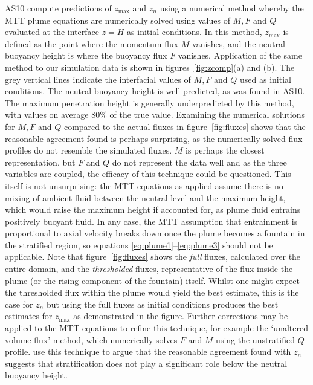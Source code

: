 \documentclass[a4paper]{article}
\begin{document}
AS10 compute predictions of $z_{\max}$ and $z_n$ using a numerical method whereby the MTT plume equations are
numerically solved using values of $M, F$ and $Q$ evaluated at the interface $z=H$ as initial conditions. In
this method, $z_{\max}$ is defined as the point where the momentum flux $M$ vanishes, and the neutral buoyancy
height is where the buoyancy flux $F$ vanishes. Application of the same method to our simulation data is shown
in figures~\ref{fig:zcomp}(a) and (b). The grey vertical lines indicate the interfacial values of $M, F$ and
$Q$ used as initial conditions. The neutral buoyancy height is well predicted, as was found in AS10. The
maximum penetration height is generally underpredicted by this method, with values on average $80\%$ of the
true value. Examining the numerical solutions for $M, F$ and $Q$ compared to the actual fluxes in
figure~\ref{fig:fluxes} shows that the reasonable agreement found is perhaps surprising, as the numerically
solved flux profiles do not resemble the simulated fluxes. $M$ is perhaps the closest representation, but $F$
and $Q$ do not represent the data well and as the three variables are coupled, the efficacy of this technique
could be questioned. This itself is not unsurprising: the MTT equations as applied assume there is no mixing
of ambient fluid between the neutral level and the maximum height, which would raise the maximum height if
accounted for, as plume fluid entrains positively buoyant fluid. In any case, the MTT assumption that
entrainment is proportional to axial velocity breaks down once the plume becomes a fountain in the stratified
region, so equations \eqref{eq:plume1}--\eqref{eq:plume3} should not be applicable. Note that
figure~\ref{fig:fluxes} shows the \emph{full} fluxes, calculated over the entire domain, and the
\emph{thresholded} fluxes, representative of the flux inside the plume (or the rising component of the
fountain) itself. Whilst one might expect the thresholded flux within the plume would yield the best estimate,
this is the case for $z_n$ but using the full fluxes as initial conditions produces the best estimates for
$z_{\max}$ as demonstrated in the figure. Further corrections may be applied to the MTT equations to refine
this technique, for example the `unaltered volume flux' method, which numerically solves $F$ and $M$ using the
unstratified $Q$-profile. \citet{devenish2010} use this technique to argue that the reasonable agreement found
with $z_n$ suggests that stratification does not play a significant role below the neutral buoyancy height.
\end{document}
